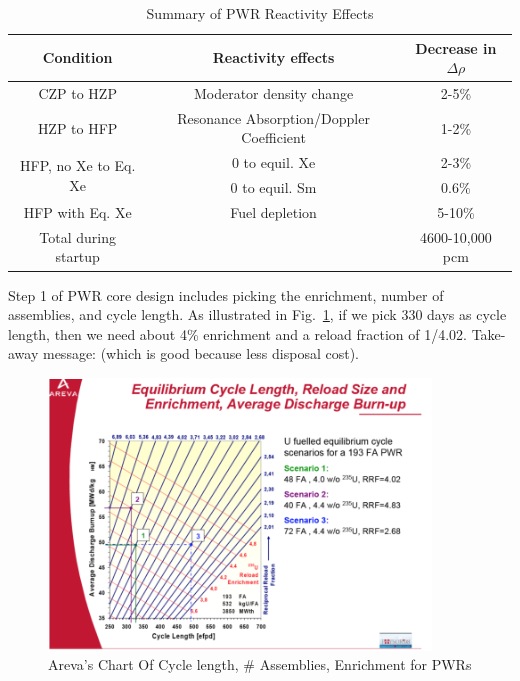 \documentclass{school-22.211-notes}
\begin{document}
\begin{table}[ht]
  \centering
  \begin{tabular}{c|c|c} \hline
    Condition & Reactivity effects & Decrease in $\Delta \rho$ \\ \hline
    CZP to HZP & Moderator density change & 2-5\% \\ \hline
    HZP to HFP & Resonance Absorption/Doppler Coefficient & 1-2\% \\ \hline
    \multirow{2}{*}{HFP, no Xe to Eq. Xe} & 0 to equil. Xe & 2-3\% \\ 
    & 0 to equil. Sm & 0.6\% \\ \hline
    HFP with Eq. Xe & Fuel depletion & 5-10\% \\ \hline \hline
    Total during startup &   & 4600-10,000 pcm \\ \hline
  \end{tabular}
  \caption{Summary of PWR Reactivity Effects} \label{PWR-reactivity}
\end{table}

\clearpage
{}
Step 1 of PWR core design includes picking the enrichment, number of assemblies, and cycle length. As illustrated in Fig.~\ref{areva-lattice-design}, if we pick 330 days as cycle length, then we need about 4\% enrichment and a reload fraction of 1/4.02. Take-away message:  (which is good because less disposal cost). 

  \begin{figure}[ht]
    \centering
    \includegraphics[width=4in]{images/design/areva-lattice-design.png}
    \caption{Areva's Chart Of Cycle length, \# Assemblies, Enrichment for PWRs} \label{areva-lattice-design}
  \end{figure}
\end{document}
